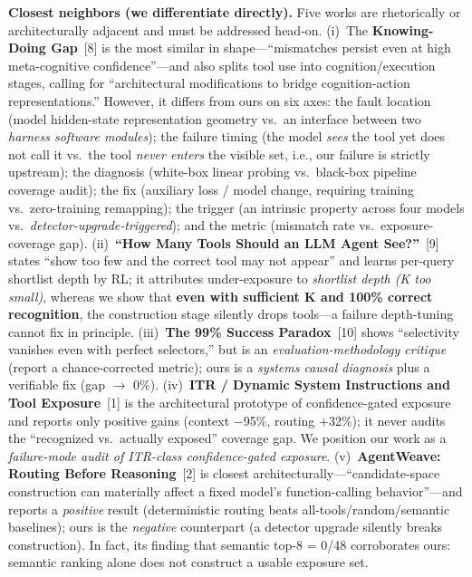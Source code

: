 \textbf{Closest neighbors (we differentiate directly).} Five works are rhetorically or architecturally adjacent and must be addressed head-on. (i)~The \textbf{Knowing-Doing Gap}~[8] is the most similar in shape---``mismatches persist even at high meta-cognitive confidence''---and also splits tool use into cognition/execution stages, calling for ``architectural modifications to bridge cognition-action representations.'' However, it differs from ours on six axes: the fault location (model hidden-state representation geometry vs.\ an interface between two \emph{harness software modules}); the failure timing (the model \emph{sees} the tool yet does not call it vs.\ the tool \emph{never enters} the visible set, i.e., our failure is strictly upstream); the diagnosis (white-box linear probing vs.\ black-box pipeline coverage audit); the fix (auxiliary loss / model change, requiring training vs.\ zero-training remapping); the trigger (an intrinsic property across four models vs.\ \emph{detector-upgrade-triggered}); and the metric (mismatch rate vs.\ exposure-coverage gap). (ii)~\textbf{``How Many Tools Should an LLM Agent See?''}~[9] states ``show too few and the correct tool may not appear'' and learns per-query shortlist depth by RL; it attributes under-exposure to \emph{shortlist depth (K too small)}, whereas we show that \textbf{even with sufficient K and 100\% correct recognition}, the construction stage silently drops tools---a failure depth-tuning cannot fix in principle. (iii)~\textbf{The 99\% Success Paradox}~[10] shows ``selectivity vanishes even with perfect selectors,'' but is an \emph{evaluation-methodology critique} (report a chance-corrected metric); ours is a \emph{systems causal diagnosis} plus a verifiable fix (gap $\rightarrow$ 0\%). (iv)~\textbf{ITR / Dynamic System Instructions and Tool Exposure}~[1] is the architectural prototype of confidence-gated exposure and reports only positive gains (context $-$95\%, routing +32\%); it never audits the ``recognized vs.\ actually exposed'' coverage gap. We position our work as a \emph{failure-mode audit of ITR-class confidence-gated exposure}. (v)~\textbf{AgentWeave: Routing Before Reasoning}~[2] is closest architecturally---``candidate-space construction can materially affect a fixed model's function-calling behavior''---and reports a \emph{positive} result (deterministic routing beats all-tools/random/semantic baselines); ours is the \emph{negative} counterpart (a detector upgrade silently breaks construction). In fact, its finding that semantic top-8 = 0/48 corroborates ours: semantic ranking alone does not construct a usable exposure set.

